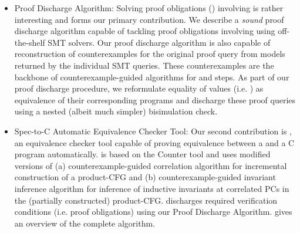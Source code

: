 \begin{itemize}
\item Proof Discharge Algorithm: Solving proof obligations ()
involving \recursiveRelations{} is rather interesting and forms our primary contribution.
We describe a {\em sound} proof discharge algorithm capable of tackling proof obligations involving
\recursiveRelations{} using off-the-shelf SMT solvers. Our proof discharge algorithm is also capable of
reconstruction of counterexamples for the original proof query from models returned by the individual SMT queries.
These counterexamples are the backbone of counterexample-guided algorithms for
 and  steps. As part of our proof discharge procedure,
we reformulate equality of values (i.e. \recursiveRelations{}) as equivalence of their corresponding programs
and discharge these proof queries using a nested (albeit much simpler) bisimulation check.

\item Spec-to-C Automatic Equivalence Checker Tool: Our second contribution is \toolName{}, an equivalence checker tool
capable of proving equivalence between a \SpecL{} and a C program automatically.
\toolName{} is based on
the Counter tool\cite{oopsla20} and uses modified versions of (a) counterexample-guided correlation algorithm for
incremental construction of a product-CFG and (b) counterexample-guided invariant inference algorithm
for inference of inductive invariants at correlated PCs in the (partially constructed) product-CFG.
\toolName{} discharges required verification conditions (i.e. proof obligations) using our Proof Discharge Algorithm.
 gives an overview of the complete algorithm.
\end{itemize}

